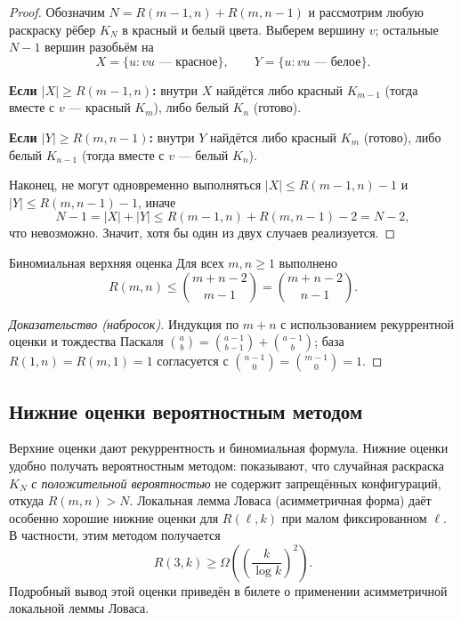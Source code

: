 \begin{proof}
	Обозначим $N=R(m-1,n)+R(m,n-1)$ и рассмотрим любую раскраску рёбер $K_N$ в красный и белый цвета. Выберем вершину $v$; остальные $N-1$ вершин разобьём на
	\[
	X=\{u : vu \text{ — красное}\},
	\qquad
	Y=\{u : vu \text{ — белое}\}.
	\]

	\textbf{Если $|X|\ge R(m-1,n)$:} внутри $X$ найдётся либо красный $K_{m-1}$ (тогда вместе с $v$ — красный $K_m$), либо белый $K_n$ (готово).

	\textbf{Если $|Y|\ge R(m,n-1)$:} внутри $Y$ найдётся либо красный $K_m$ (готово), либо белый $K_{n-1}$ (тогда вместе с $v$ — белый $K_n$).

	Наконец, не могут одновременно выполняться $|X|\le R(m-1,n)-1$ и $|Y|\le R(m,n-1)-1$, иначе
	\[
	N-1=|X|+|Y|\le R(m-1,n)+R(m,n-1)-2=N-2,
	\]
	что невозможно. Значит, хотя бы один из двух случаев реализуется.
\end{proof}

\begin{Corollary}{Биномиальная верхняя оценка}{}
	Для всех $m,n\ge 1$ выполнено
	\[
	R(m,n)\le \binom{m+n-2}{m-1}=\binom{m+n-2}{n-1}.
	\]
\end{Corollary}

\begin{proof}[Доказательство (набросок)]
	Индукция по $m+n$ с использованием рекуррентной оценки и тождества Паскаля $\binom{a}{b}=\binom{a-1}{b-1}+\binom{a-1}{b}$; база $R(1,n)=R(m,1)=1$ согласуется с $\binom{n-1}{0}=\binom{m-1}{0}=1$.
\end{proof}

\subsection{Нижние оценки вероятностным методом}

\begin{Remark}{}{}
	Верхние оценки дают рекуррентность и биномиальная формула. Нижние оценки удобно получать вероятностным методом: показывают, что случайная раскраска $K_N$ \emph{с положительной вероятностью} не содержит запрещённых конфигураций, откуда $R(m,n)>N$. Локальная лемма Ловаса (асимметричная форма) даёт особенно хорошие нижние оценки для $R(\ell,k)$ при малом фиксированном $\ell$. В частности, этим методом получается
	\[
	R(3,k)\ge \Omega\!\left(\left(\frac{k}{\log k}\right)^2\right).
	\]
	Подробный вывод этой оценки приведён в билете о применении асимметричной локальной леммы Ловаса.
\end{Remark}
